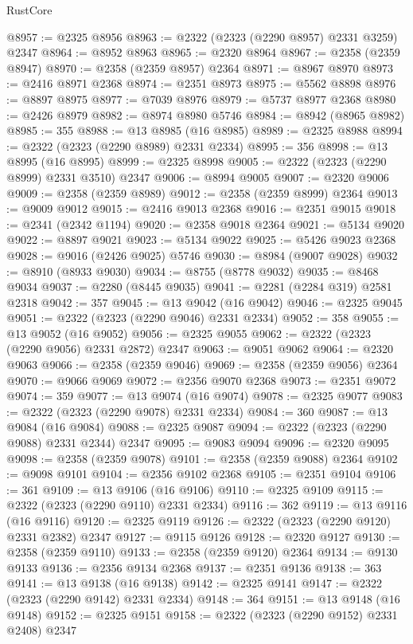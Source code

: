\begin{lexlean}{RustCore}
\begin{coremodule}
@8957 := @2325 @8956
@8963 := @2322 (@2323 (@2290 @8957) @2331 @3259) @2347
@8964 := @8952 @8963
@8965 := @2320 @8964
@8967 := @2358 (@2359 @8947)
@8970 := @2358 (@2359 @8957) @2364
@8971 := @8967 @8970
@8973 := @2416 @8971 @2368
@8974 := @2351 @8973
@8975 := @5562 @8898
@8976 := @8897 @8975
@8977 := @7039 @8976
@8979 := @5737 @8977 @2368
@8980 := @2426 @8979
@8982 := @8974 @8980 @5746
@8984 := @8942 (@8965 @8982)
@8985 := 355
@8988 := @13 @8985 (@16 @8985)
@8989 := @2325 @8988
@8994 := @2322 (@2323 (@2290 @8989) @2331 @2334)
@8995 := 356
@8998 := @13 @8995 (@16 @8995)
@8999 := @2325 @8998
@9005 := @2322 (@2323 (@2290 @8999) @2331 @3510) @2347
@9006 := @8994 @9005
@9007 := @2320 @9006
@9009 := @2358 (@2359 @8989)
@9012 := @2358 (@2359 @8999) @2364
@9013 := @9009 @9012
@9015 := @2416 @9013 @2368
@9016 := @2351 @9015
@9018 := @2341 (@2342 @1194)
@9020 := @2358 @9018 @2364
@9021 := @5134 @9020
@9022 := @8897 @9021
@9023 := @5134 @9022
@9025 := @5426 @9023 @2368
@9028 := @9016 (@2426 @9025) @5746
@9030 := @8984 (@9007 @9028)
@9032 := @8910 (@8933 @9030)
@9034 := @8755 (@8778 @9032)
@9035 := @8468 @9034
@9037 := @2280 (@8445 @9035)
@9041 := @2281 (@2284 @319) @2581 @2318
@9042 := 357
@9045 := @13 @9042 (@16 @9042)
@9046 := @2325 @9045
@9051 := @2322 (@2323 (@2290 @9046) @2331 @2334)
@9052 := 358
@9055 := @13 @9052 (@16 @9052)
@9056 := @2325 @9055
@9062 := @2322 (@2323 (@2290 @9056) @2331 @2872) @2347
@9063 := @9051 @9062
@9064 := @2320 @9063
@9066 := @2358 (@2359 @9046)
@9069 := @2358 (@2359 @9056) @2364
@9070 := @9066 @9069
@9072 := @2356 @9070 @2368
@9073 := @2351 @9072
@9074 := 359
@9077 := @13 @9074 (@16 @9074)
@9078 := @2325 @9077
@9083 := @2322 (@2323 (@2290 @9078) @2331 @2334)
@9084 := 360
@9087 := @13 @9084 (@16 @9084)
@9088 := @2325 @9087
@9094 := @2322 (@2323 (@2290 @9088) @2331 @2344) @2347
@9095 := @9083 @9094
@9096 := @2320 @9095
@9098 := @2358 (@2359 @9078)
@9101 := @2358 (@2359 @9088) @2364
@9102 := @9098 @9101
@9104 := @2356 @9102 @2368
@9105 := @2351 @9104
@9106 := 361
@9109 := @13 @9106 (@16 @9106)
@9110 := @2325 @9109
@9115 := @2322 (@2323 (@2290 @9110) @2331 @2334)
@9116 := 362
@9119 := @13 @9116 (@16 @9116)
@9120 := @2325 @9119
@9126 := @2322 (@2323 (@2290 @9120) @2331 @2382) @2347
@9127 := @9115 @9126
@9128 := @2320 @9127
@9130 := @2358 (@2359 @9110)
@9133 := @2358 (@2359 @9120) @2364
@9134 := @9130 @9133
@9136 := @2356 @9134 @2368
@9137 := @2351 @9136
@9138 := 363
@9141 := @13 @9138 (@16 @9138)
@9142 := @2325 @9141
@9147 := @2322 (@2323 (@2290 @9142) @2331 @2334)
@9148 := 364
@9151 := @13 @9148 (@16 @9148)
@9152 := @2325 @9151
@9158 := @2322 (@2323 (@2290 @9152) @2331 @2408) @2347

\end{coremodule}
\end{lexlean}
